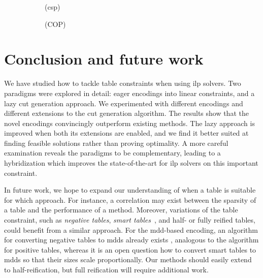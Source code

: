 \documentclass[a4paper,UKenglish,cleveref,autoref,thm-restate]{lipics-v2021}
\begin{document}
\newcommand{\compare}{base_gurobi-mdd-reduce-dom-incr-nocombined--lazy_gurobi-hybrid_0}

\newcommand{\subfigureWidth}{0.49\linewidth}
\newcommand{\svgWidth}{1.0\linewidth}
\begin{figure}[t]
    \begin{subfigure}{\subfigureWidth}
        \centering
        
        \caption{\XCSPYears (\gls{csp})}
        \label{fig:scatter:csp}
    \end{subfigure}
    \begin{subfigure}{\subfigureWidth}
        \centering
        
        \caption{\XCSPYears (COP)}
        \label{fig:scatter:cop}
    \end{subfigure}
    \caption{\scatterCaption}
    \label{fig:scatter}
\end{figure}

\section{Conclusion and future work}

We have studied how to tackle table constraints when using \gls{ilp} solvers.
Two paradigms were explored in detail: eager encodings into linear constraints, and a lazy cut generation approach.
We experimented with different encodings and different extensions to the cut generation algorithm.
The results show that the novel encodings convincingly outperform existing methods.
The lazy approach is improved when both its extensions are enabled, and we find it better suited at finding feasible solutions rather than proving optimality.
A more careful examination reveals the paradigms to be complementary, leading to a hybridization which improves the state-of-the-art for \gls{ilp} solvers on this important constraint.

In future work, we hope to expand our understanding of when a table is suitable for which approach.
For instance, a correlation may exist between the sparsity of a table and the performance of a method.
Moreover, variations of the table constraint, such as \textit{negative tables}, \textit{smart tables}~\cite{DBLP:conf/cpaior/MairyDL15}, and half- or fully reified tables, could benefit from a similar approach.
For the \gls{mdd}-based encoding, an algorithm for converting negative tables to \glspl{mdd} already exists \cite{DBLP:journals/constraints/ChengY10}, analogous to the algorithm for positive tables, whereas it is an open question how to convert smart tables to \glspl{mdd} so that their sizes scale proportionally.
Our methods should easily extend to half-reification, but full reification will require additional work. 
\end{document}
